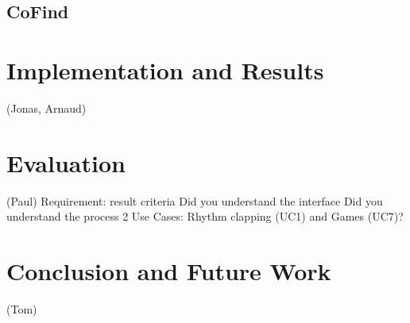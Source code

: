 \documentclass[runningheads,a4paper]{llncs}
\begin{document}
\subsection{CoFind}

\section{Implementation and Results}
(Jonas, Arnaud)

\section{Evaluation}
(Paul)
Requirement: result criteria
Did you understand the interface
Did you understand the process
2 Use Cases: Rhythm clapping (UC1) and Games (UC7)?

\section{Conclusion and Future Work}
(Tom)



\end{document}
